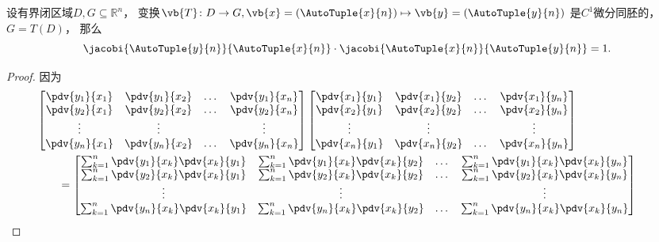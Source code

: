 \begin{proposition}
设有界闭区域\(D,G\subseteq\mathbb{R}^n\)，
变换\(\vb{T}\colon D \to G,\vb{x}=(\AutoTuple{x}{n})\mapsto\vb{y}=(\AutoTuple{y}{n})\)
是\(C^1\)微分同胚的，\(G = T(D)\)，
那么\begin{equation*}
	\jacobi{\AutoTuple{y}{n}}{\AutoTuple{x}{n}}
	\cdot
	\jacobi{\AutoTuple{x}{n}}{\AutoTuple{y}{n}}
	= 1.
\end{equation*}
\begin{proof}
因为\begin{align*}
	&\hspace{-20pt}
	\begin{bmatrix}
		\pdv{y_1}{x_1} & \pdv{y_1}{x_2} & \dots & \pdv{y_1}{x_n} \\
		\pdv{y_2}{x_1} & \pdv{y_2}{x_2} & \dots & \pdv{y_2}{x_n} \\
		\vdots & \vdots & & \vdots \\
		\pdv{y_n}{x_1} & \pdv{y_n}{x_2} & \dots & \pdv{y_n}{x_n} \\
	\end{bmatrix}
	\begin{bmatrix}
		\pdv{x_1}{y_1} & \pdv{x_1}{y_2} & \dots & \pdv{x_1}{y_n} \\
		\pdv{x_2}{y_1} & \pdv{x_2}{y_2} & \dots & \pdv{x_2}{y_n} \\
		\vdots & \vdots & & \vdots \\
		\pdv{x_n}{y_1} & \pdv{x_n}{y_2} & \dots & \pdv{x_n}{y_n} \\
	\end{bmatrix} \\
	&= \begin{bmatrix}
		\sum_{k=1}^n \pdv{y_1}{x_k} \pdv{x_k}{y_1}
		& \sum_{k=1}^n \pdv{y_1}{x_k} \pdv{x_k}{y_2}
		& \dots
		& \sum_{k=1}^n \pdv{y_1}{x_k} \pdv{x_k}{y_n} \\
		\sum_{k=1}^n \pdv{y_2}{x_k} \pdv{x_k}{y_1}
		& \sum_{k=1}^n \pdv{y_2}{x_k} \pdv{x_k}{y_2}
		& \dots
		& \sum_{k=1}^n \pdv{y_2}{x_k} \pdv{x_k}{y_n} \\
		\vdots & \vdots & & \vdots \\
		\sum_{k=1}^n \pdv{y_n}{x_k} \pdv{x_k}{y_1}
		& \sum_{k=1}^n \pdv{y_n}{x_k} \pdv{x_k}{y_2}
		& \dots
		& \sum_{k=1}^n \pdv{y_n}{x_k} \pdv{x_k}{y_n} \\

\end{bmatrix}
\end{align*}
\end{proof}
\end{proposition}
